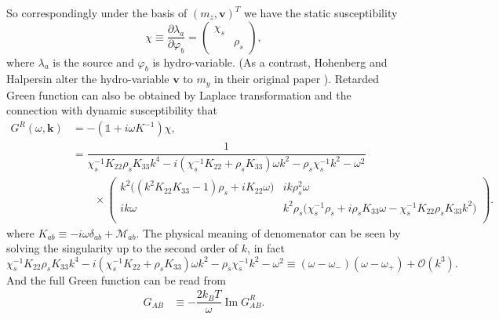 \documentclass[10pt,nofootinbib,letterpaper]{revtex4}
\begin{document}
		So correspondingly under the basis of $(m_z,\bm{v})^T$ we have the static susceptibility
		\begin{equation}\label{2.3.6}
			\chi\equiv\dfrac{\partial \lambda_a}{\partial \varphi_b}=\left(\begin{array}{cc}
				\chi_s & \\ & \rho_s
			\end{array}\right),
		\end{equation}
		where $\lambda_a$ is the source and $\varphi_b$ is hydro-variable. (As a contrast, Hohenberg and Halpersin alter the hydro-variable $\bm{v}$ to $m_y$ in their original paper \cite{halperin1969hydrodynamic}). Retarded Green function can also be obtained by Laplace transformation and the connection with dynamic susceptibility \cite{kovtun2012lectures} that
		\begin{align}
			G^R(\omega,\bm{k})&=-(\mathds{1}+i\omega K^{-1})\chi,\label{2.3.7}\\
			&=\dfrac{1}{\chi_s^{-1}K_{22}\rho_s K_{33}k^4-i(\chi_s^{-1}K_{22}+\rho_sK_{33})\omega k^2-\rho_s\chi_s^{-1}k^2-\omega^2}\nonumber\\
			&\qquad\times \left(\begin{array}{cc}
				k^2\bigg((k^2 K_{22}
				K_{33}-1) \rho_s+i K_{22}\omega\bigg) & ik \rho_s^2\omega\\
				i k\omega & k^2\rho_s\bigg(\chi_s^{-1}\rho_s+i\rho_sK_{33}\omega-\chi_s^{-1}K_{22}\rho_sK_{33} k^2\bigg)\\
				\end{array}\right).\label{2.3.8}
		\end{align}
		where $K_{ab}\equiv -i\omega\delta_{ab}+\mathcal{M}_{ab}$. The physical meaning of denomenator can be seen by solving the singularity up to the second order of $k$, in fact
		\begin{equation*}
			\chi_s^{-1}K_{22}\rho_s K_{33}k^4-i(\chi_s^{-1}K_{22}+\rho_sK_{33})\omega k^2-\rho_s\chi_s^{-1}k^2-\omega^2\equiv(\omega-\omega_-)(\omega-\omega_+)+\mathcal{O}(k^3).
		\end{equation*}
		And the full Green function can be read from
		\begin{align}
			G_{AB}&\equiv-\dfrac{2k_BT}{\omega}\mathop{\mathrm{Im}}G^R_{AB}.
		\end{align}
\end{document}
